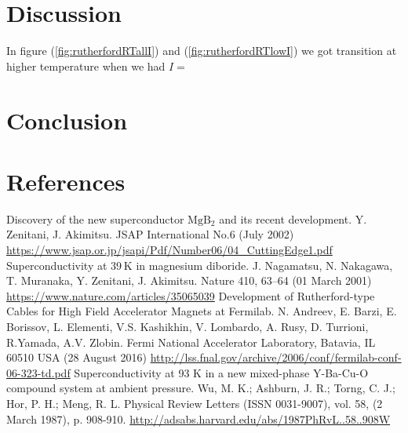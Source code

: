 \documentclass{comjnl}
\newcommand*\chem[1]{\ensuremath{\mathrm{#1}}}
\begin{document}
\section{Discussion} \label{Sec:Discussion}
In figure (\ref{fig:rutherfordRTallI}) and (\ref{fig:rutherfordRTlowI}) we got transition at higher temperature when we had $I=$

\section{Conclusion} \label{Sec:Conclusion}


\section{References}
\begingroup
\renewcommand{\section}[2]{}
\begin{thebibliography}{}
  Discovery of the new superconductor \chem{MgB_2} and its recent development. 
  Y. Zenitani, J. Akimitsu. 
  JSAP International No.6 (July 2002)
  \url{https://www.jsap.or.jp/jsapi/Pdf/Number06/04_CuttingEdge1.pdf}
  Superconductivity at 39 K in magnesium diboride. 
  J. Nagamatsu, N. Nakagawa, T. Muranaka, Y. Zenitani, J. Akimitsu. 
  Nature 410, 63–64 (01 March 2001)
  \url{https://www.nature.com/articles/35065039}
  Development of Rutherford-type Cables for High Field Accelerator Magnets at Fermilab.
  N. Andreev, E. Barzi, E. Borissov, L. Elementi, V.S. Kashikhin, V. Lombardo, A. Rusy, D. Turrioni, 
R.Yamada, A.V. Zlobin.
   Fermi  National  Accelerator  Laboratory,  Batavia, IL 60510 USA (28 August 2016)
  \url{http://lss.fnal.gov/archive/2006/conf/fermilab-conf-06-323-td.pdf}
  Superconductivity at 93 K in a new mixed-phase Y-Ba-Cu-O compound system at ambient pressure.
  Wu, M. K.; Ashburn, J. R.; Torng, C. J.; Hor, P. H.; Meng, R. L.
  Physical Review Letters (ISSN 0031-9007), vol. 58, (2 March 1987), p. 908-910.
  \url{http://adsabs.harvard.edu/abs/1987PhRvL..58..908W}
\end{thebibliography}
\endgroup
\nocite{*}



\end{document}
